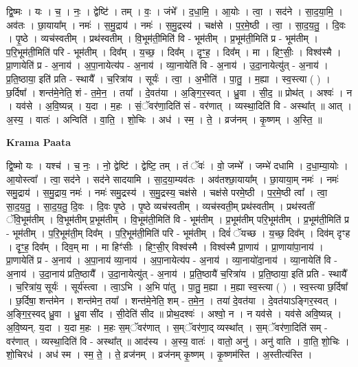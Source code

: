 \documentclass[17pt]{extarticle}
\begin{document}
द्वि॒ष्मः । यः । च॒ । नः॒ । द्वेष्टि॑ । तम् । वः॒ । जंभे᳚ । द॒धा॒मि॒ । आ॒योः । त्वा॒ । सद॑ने । सा॒द॒या॒मि॒ । अव॑तः । छा॒याया᳚म् । नमः॑ । स॒मु॒द्राय॑ । नमः॑ । स॒मु॒द्रस्य॑ । चक्ष॑से । प॒र॒मे॒ष्ठी । त्वा॒ । सा॒द॒य॒तु॒ । दि॒वः । पृ॒ष्ठे । व्यच॑स्वतीम् । प्रथ॑स्वतीम् । वि॒भूम॑ती॒मिति॑ वि - भूम॑तीम् । प्र॒भूम॑ती॒मिति॑ प्र - भूम॑तीम् । प॒रि॒भूम॑ती॒मिति॑ परि - भूम॑तीम् । दिव᳚म् । य॒च्छ॒ । दिव᳚म् । दृꣳ॒॒ह॒ । दिव᳚म् । मा । हिꣳ॒॒सीः॒ । विश्व॑स्मै । प्रा॒णायेति॑ प्र - अ॒नाय॑ । अ॒पा॒नायेत्य॑प - अ॒नाय॑ । व्या॒नायेति॑ वि - अ॒नाय॑ । उ॒दा॒नायेत्यु॑त् - अ॒नाय॑ । प्र॒ति॒ष्ठाया॒ इति॑ प्रति - स्थायै᳚ । च॒रित्रा॑य । सूर्यः॑ । त्वा॒ । अ॒भीति॑ । पा॒तु॒ । म॒ह्या । स्व॒स्त्या ( ) । छ॒र्दिषा᳚ । शन्त॑मे॒नेति॒ शं - त॒मे॒न॒ । तया᳚ । दे॒वत॑या । अ॒ङ्गि॒र॒स्वत् । ध्रु॒वा । सी॒द॒ ॥ प्रोथ॑त् । अश्वः॑ । न । यव॑से । अ॒वि॒ष्यन्न् । य॒दा । म॒हः । सं॒ॅवर॑णा॒दिति॑ सं - वर॑णात् । व्यस्था॒दिति॑ वि - अस्था᳚त् ॥ आत् । अ॒स्य॒ । वातः॑ । अन्विति॑ । वा॒ति॒ । शो॒चिः । अध॑ । स्म॒ । ते॒ । व्रज॑नम् । कृ॒ष्णम् । अ॒स्ति॒ ॥  \newline


\textbf{Krama Paata} \newline

द्वि॒ष्मो यः । यश्च॑ । च॒ नः॒ । नो॒ द्वेष्टि॑ । द्वेष्टि॒ तम् । तं ॅवः॑ । वो॒ जम्भे᳚ । जम्भे॑ दधामि । द॒धा॒म्या॒योः । आ॒योस्त्वा᳚ । त्वा॒ सद॑ने । सद॑ने सादयामि । सा॒द॒या॒म्यव॑तः । अव॑तश्छा॒याया᳚म् । छा॒याया॒म् नमः॑ । नमः॑ समु॒द्राय॑ । स॒मु॒द्राय॒ नमः॑ । नमः॑ समु॒द्रस्य॑ । स॒मु॒द्रस्य॒ चक्ष॑से । चक्ष॑से परमे॒ष्ठी । प॒र॒मे॒ष्ठी त्वा᳚ । त्वा॒ सा॒द॒य॒तु॒ । सा॒द॒य॒तु॒ दि॒वः । दि॒वः पृ॒ष्ठे । पृ॒ष्ठे व्यच॑स्वतीम् । व्यच॑स्वती॒म् प्रथ॑स्वतीम् । प्रथ॑स्वतीं ॅवि॒भूम॑तीम् । वि॒भूम॑तीम् प्र॒भूम॑तीम् । वि॒भूम॑ती॒मिति॑ वि - भूम॑तीम् । प्र॒भूम॑तीम् परि॒भूम॑तीम् । प्र॒भूम॑ती॒मिति॑ प्र - भूम॑तीम् । प॒रि॒भूम॑ती॒म् दिव᳚म् । प॒रि॒भूम॑ती॒मिति॑ परि - भूम॑तीम् । दिवं॑ ॅयच्छ । य॒च्छ॒ दिव᳚म् । दिव॑म् दृꣳह । दृꣳ॒॒ह॒ दिव᳚म् । दिव॒म् मा । मा हिꣳ॑सीः । हिꣳ॒॒सी॒र् विश्व॑स्मै । विश्व॑स्मै प्रा॒णाय॑ । प्रा॒णाया॑पा॒नाय॑ । प्रा॒णायेति॑ प्र - अ॒नाय॑ । अ॒पा॒नाय॑ व्या॒नाय॑ । अ॒पा॒नायेत्य॑प - अ॒नाय॑ । व्या॒नायो॑दा॒नाय॑ । व्या॒नायेति॑ वि - अ॒नाय॑ । उ॒दा॒नाय॑ प्रति॒ष्ठायै᳚ । उ॒दा॒नायेत्यु॑त् - अ॒नाय॑ । प्र॒ति॒ष्ठायै॑ च॒रित्रा॑य । प्र॒ति॒ष्ठाया॒ इति॑ प्रति - स्थायै᳚ । च॒रित्रा॑य॒ सूर्यः॑ । सूर्य॑स्त्वा । त्वा॒ऽभि । अ॒भि पा॑तु । पा॒तु॒ म॒ह्या । म॒ह्या स्व॒स्त्या ( ) । स्व॒स्त्या छ॒र्दिषा᳚ । छ॒र्दिषा॒ शन्त॑मेन । शन्त॑मेन॒ तया᳚ । शन्त॑मे॒नेति॒ शम् - त॒मे॒न॒ । तया॑ दे॒वत॑या । दे॒वत॑याऽङ्गिर॒स्वत् । अ॒ङ्गि॒र॒स्वद् ध्रु॒वा । ध्रु॒वा सी॑द । सी॒देति॑ सीद ॥ प्रोथ॒दश्वः॑ । अश्वो॒ न । न यव॑से । यव॑से अवि॒ष्यन्न् । अ॒वि॒ष्यन्. य॒दा । य॒दा म॒हः । म॒हः स॒म्ॅवर॑णात् । स॒म्ॅवर॑णा॒द् व्यस्था᳚त् । स॒म्ॅवर॑णा॒दिति॑ सम् - वर॑णात् । व्यस्था॒दिति॑ वि - अस्था᳚त् ॥ आद॑स्य । अ॒स्य॒ वातः॑ । वातो॒ अनु॑ । अनु॑ वाति । वा॒ति॒ शो॒चिः । शो॒चिरध॑ । अध॑ स्म । स्म॒ ते॒ । ते॒ व्रज॑नम् । व्रज॑नम् कृ॒ष्णम् । कृ॒ष्णम॑स्ति । अ॒स्तीत्य॑स्ति । \newline
\end{document}
